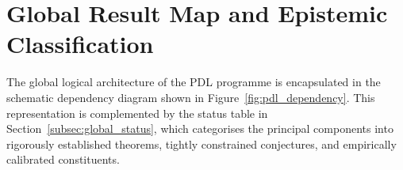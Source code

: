\documentclass[11pt,a4paper]{article}
\begin{document}
\section{Global Result Map and Epistemic Classification}
\label{sec:global_map}

The global logical architecture of the PDL programme is encapsulated in the schematic dependency diagram shown in Figure~\ref{fig:pdl_dependency}. This representation is complemented by the status table in Section~\ref{subsec:global_status}, which categorises the principal components into rigorously established theorems, tightly constrained conjectures, and empirically calibrated constituents.

%
%
\end{document}
